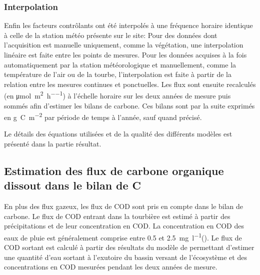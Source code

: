 \subsubsection{Interpolation}

Enfin les facteurs contrôlants ont été interpolés à une fréquence horaire identique à celle de la station météo présente sur le site:
Pour des données dont l'acquisition est manuelle uniquement, comme la végétation, une interpolation linéaire est faite entre les points de mesures.
Pour les données acquises à la fois automatiquement par la station météorologique et manuellement, comme la température de l'air ou de la tourbe, l'interpolation est faite à partir de la relation entre les mesures continues et ponctuelles.
Les flux sont ensuite recalculés (en \si{\micro\mole\per\square\meter\per\hour}) à l'échelle horaire sur les deux années de mesure puis sommés afin d'estimer les bilans de carbone.
Ces bilans sont par la suite exprimés en \si{\gram C m^{-2}} par période de temps à l'année, sauf quand précisé.

Le détails des équations utilisées et de la qualité des différents modèles est présenté dans la partie résultat.

\subsection{Estimation des flux de carbone organique dissout dans le bilan de C}

En plus des flux gazeux, les flux de COD sont pris en compte dans le bilan de carbone.
Le flux de COD entrant dans la tourbière est estimé à partir des précipitations et de leur concentration en COD.
La concentration en COD des eaux de pluie est généralement comprise entre \num{0.5} et \SI{2.5}{\milli\gram\per\litre}(\citep{sigg2014}).
Le flux de COD sortant est calculé à partir des résultats  du modèle de \citet{binet2013} permettant d'estimer une quantité d'eau sortant à l'exutoire du bassin versant de l'écosystème et des concentrations en COD mesurées pendant les deux années de mesure.

